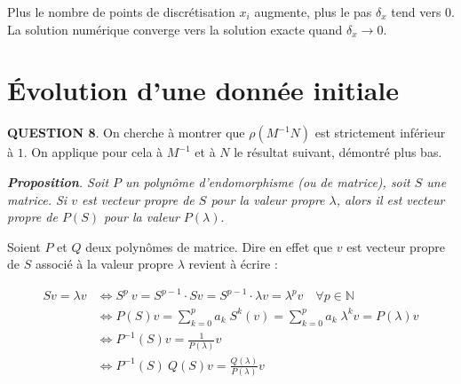 \documentclass[a4paper,11pt]{article}
\newcommand{\quest}[1]{\small\textbf{#1}\normalsize}
\theoremstyle{nonumberplain}
\theoremstyle{nonumberplain}
\theoremstyle{nonumberplain}
\begin{document}
    Plus le nombre de points de discrétisation $x_{i}$ augmente, plus le pas $\delta_{x}$ tend vers $0$.
    La solution numérique converge vers la solution exacte quand $\delta_x \rightarrow 0$.

\smallskip
\section{\'{E}volution d'une donnée initiale}

    \quest{QUESTION 8}. On cherche à montrer que $\rho(M^{-1}N)$ est strictement inférieur à $1$.
    On applique pour cela à $M^{-1}$ et à $N$ le résultat suivant, démontré plus bas.
    \begin{proposition}
        \hspace{-1ex}\emph{\textbf{Proposition}. Soit $P$ un polynôme d'endomorphisme
        (ou de matrice), soit $S$ une matrice. Si $v$ est vecteur propre de $S$ pour
        la valeur propre $\lambda$, alors il est vecteur propre de $P(S)$ pour la valeur $P(\lambda)$}.
    \end{proposition}

    Soient $P$ et $Q$ deux polynômes de matrice. Dire en effet que $v$ est
    vecteur propre de $S$ associé à la valeur propre $\lambda$ revient à écrire :

    \begin{equation*}
    \begin{split}
        S v = \lambda v & \iff S^{p}\ v = S^{p - 1} \cdot Sv = S^{p - 1} \cdot \lambda v = \lambda^{p} v \quad\forall p \in \mathbb{N} \\
                        & \iff P(S)v = \sum\limits_{k = 0}^{p} a_k\;S^k(v) = \sum\limits_{k = 0}^{p} a_k\;\lambda^kv = P(\lambda)v \\
                        & \iff P^{-1}(S)v = \frac{1}{P(\lambda)}v \\
                        & \iff P^{-1}(S)\ Q(S)v = \frac{Q(\lambda)}{P(\lambda)}v
    \end{split}
    \end{equation*}
\end{document}

